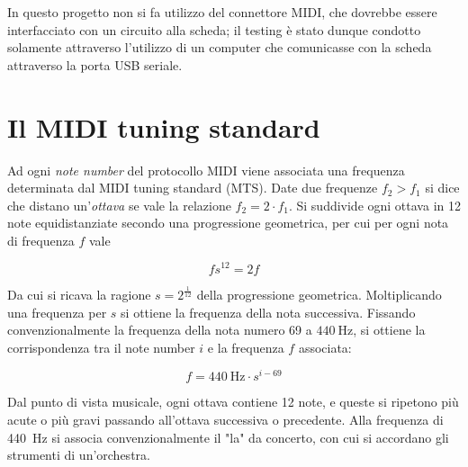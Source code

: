 In questo progetto non si fa utilizzo del connettore MIDI, che dovrebbe essere
interfacciato con un circuito alla scheda; il testing è stato dunque condotto
solamente attraverso l'utilizzo di un computer che comunicasse con la scheda
attraverso la porta USB seriale.

\section{Il MIDI tuning standard}
Ad ogni \textit{note number} del protocollo MIDI viene associata una frequenza determinata dal MIDI tuning standard (MTS).
Date due frequenze $f_2 > f_1$ si dice che distano un'\textit{ottava} se
vale la relazione $f_2 = 2 \cdot f_1$.
Si suddivide ogni ottava in 12 note equidistanziate secondo una progressione geometrica, per cui per ogni nota di frequenza $f$ vale

\[
fs^{12} = 2f 
\]

Da cui si ricava la ragione $s=2^{\frac{1}{12}}$ della progressione geometrica. Moltiplicando una frequenza per $s$ si ottiene la frequenza della nota successiva.
Fissando convenzionalmente la frequenza della nota numero 69 a $ \SI{440}{\hertz}$, si ottiene la corrispondenza tra
il note number $i$ e la frequenza $f$ associata:

\[
f = \SI{440}{\hertz} \cdot s^{i-69}
\]

Dal punto di vista musicale, ogni ottava contiene 12 note, e queste
si ripetono più acute o più gravi passando all'ottava successiva o precedente.
Alla frequenza di \SI{440}{\hertz} si associa convenzionalmente
il "la" da concerto, con cui si accordano gli strumenti di un'orchestra.


